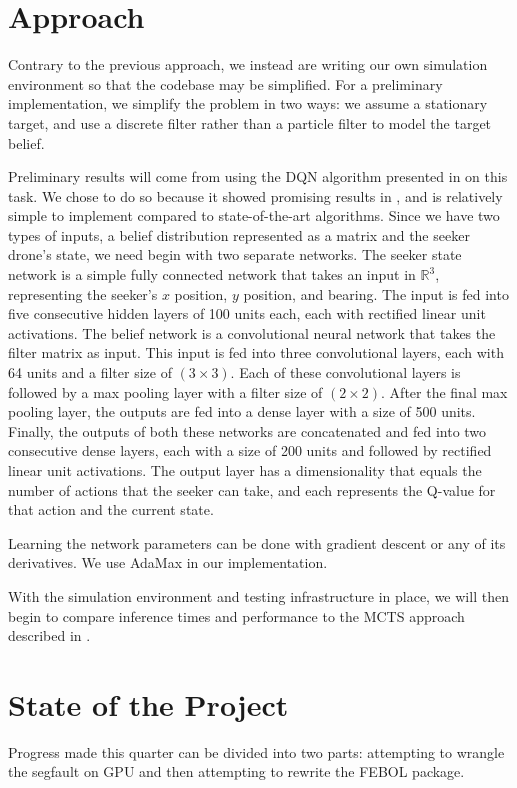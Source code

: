 \documentclass{article}
\begin{document}
\section{Approach}
Contrary to the previous approach, we instead are writing our own simulation environment so that the codebase may be simplified.
For a preliminary implementation, we simplify the problem in two ways: we assume a stationary target, and use a discrete filter rather than a particle filter to model the target belief.

Preliminary results will come from using the DQN algorithm presented in \cite{dqn} on this task. 
We chose to do so because it showed promising results in \cite{kyle}, and is relatively simple to implement compared to state-of-the-art algorithms.
Since we have two types of inputs, a belief distribution represented as a matrix and the seeker drone's state, we need begin with two separate networks. 
The seeker state network is a simple fully connected network that takes an input in $\mathbb{R}^{3}$, representing the seeker's $x$ position, $y$ position, and bearing.
The input is fed into five consecutive hidden layers of 100 units each, each with rectified linear unit activations.
The belief network is a convolutional neural network that takes the filter matrix as input.
This input is fed into three convolutional layers, each with 64 units and a filter size of $(3 \times 3)$.
Each of these convolutional layers is followed by a max pooling layer with a filter size of $(2 \times 2)$.
After the final max pooling layer, the outputs are fed into a dense layer with a size of 500 units.
Finally, the outputs of both these networks are concatenated and fed into two consecutive dense layers, each with a size of 200 units and followed by rectified linear unit activations.
The output layer has a dimensionality that equals the number of actions that the seeker can take, and each represents the Q-value for that action and the current state.

Learning the network parameters can be done with gradient descent or any of its derivatives.
We use AdaMax in our implementation.

With the simulation environment and testing infrastructure in place, we will then begin to compare inference times and performance to the MCTS approach described in \cite{dronehunter}.

\section{State of the Project}
Progress made this quarter can be divided into two parts: attempting to wrangle the segfault on GPU and then attempting to rewrite the FEBOL package.
\end{document}
